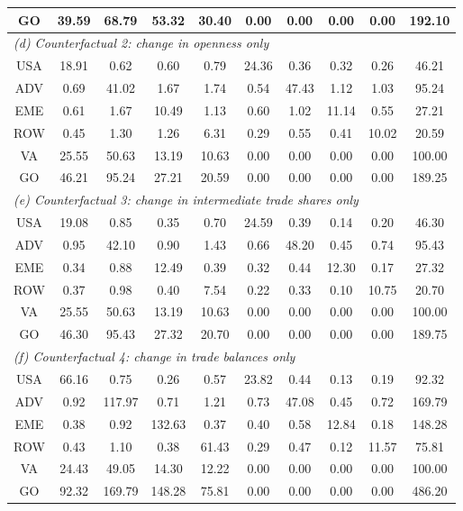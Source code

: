 \begin{table}[p]
\begin{center}
\begin{tabular}{cccccccccc}
GO& 39.59& 68.79& 53.32& 30.40& 0.00& 0.00& 0.00& 0.00& 192.10\\
\midrule
\multicolumn{10}{l}{\textit{(d) Counterfactual 2: change in openness only}}\\
USA& 18.91& 0.62& 0.60& 0.79& 24.36& 0.36& 0.32& 0.26& 46.21 \\
ADV& 0.69& 41.02& 1.67& 1.74& 0.54& 47.43& 1.12& 1.03& 95.24 \\
EME& 0.61& 1.67& 10.49& 1.13& 0.60& 1.02& 11.14& 0.55& 27.21 \\
ROW& 0.45& 1.30& 1.26& 6.31& 0.29& 0.55& 0.41& 10.02& 20.59 \\
VA& 25.55& 50.63& 13.19& 10.63& 0.00& 0.00& 0.00& 0.00& 100.00\\
GO& 46.21& 95.24& 27.21& 20.59& 0.00& 0.00& 0.00& 0.00& 189.25\\
\midrule
\multicolumn{10}{l}{\textit{(e) Counterfactual 3: change in intermediate trade shares only}}\\
USA& 19.08& 0.85& 0.35& 0.70& 24.59& 0.39& 0.14& 0.20& 46.30 \\
ADV& 0.95& 42.10& 0.90& 1.43& 0.66& 48.20& 0.45& 0.74& 95.43 \\
EME& 0.34& 0.88& 12.49& 0.39& 0.32& 0.44& 12.30& 0.17& 27.32 \\
ROW& 0.37& 0.98& 0.40& 7.54& 0.22& 0.33& 0.10& 10.75& 20.70 \\
VA& 25.55& 50.63& 13.19& 10.63& 0.00& 0.00& 0.00& 0.00& 100.00\\
GO& 46.30& 95.43& 27.32& 20.70& 0.00& 0.00& 0.00& 0.00& 189.75\\
\midrule
\multicolumn{10}{l}{\textit{(f) Counterfactual 4: change in trade balances only}}\\
USA& 66.16& 0.75& 0.26& 0.57& 23.82& 0.44& 0.13& 0.19& 92.32 \\
ADV& 0.92& 117.97& 0.71& 1.21& 0.73& 47.08& 0.45& 0.72& 169.79 \\
EME& 0.38& 0.92& 132.63& 0.37& 0.40& 0.58& 12.84& 0.18& 148.28 \\
ROW& 0.43& 1.10& 0.38& 61.43& 0.29& 0.47& 0.12& 11.57& 75.81 \\
VA& 24.43& 49.05& 14.30& 12.22& 0.00& 0.00& 0.00& 0.00& 100.00\\
GO& 92.32& 169.79& 148.28& 75.81& 0.00& 0.00& 0.00& 0.00& 486.20\\
\bottomrule
\end{tabular}
\normalsize
\end{center}
\end{table}
